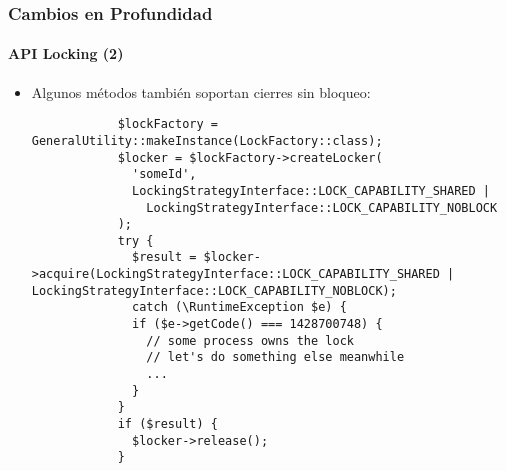 \begin{frame}[fragile]
	\frametitle{Cambios en Profundidad}
	\framesubtitle{API Locking (2)}

	\lstset{basicstyle=\tiny\ttfamily}

	\begin{itemize}

		\item Algunos métodos también soportan cierres sin bloqueo:

		\begin{lstlisting}
			$lockFactory = GeneralUtility::makeInstance(LockFactory::class);
			$locker = $lockFactory->createLocker(
			  'someId',
			  LockingStrategyInterface::LOCK_CAPABILITY_SHARED |
			    LockingStrategyInterface::LOCK_CAPABILITY_NOBLOCK
			);
			try {
			  $result = $locker->acquire(LockingStrategyInterface::LOCK_CAPABILITY_SHARED | LockingStrategyInterface::LOCK_CAPABILITY_NOBLOCK);
			  catch (\RuntimeException $e) {
			  if ($e->getCode() === 1428700748) {
			    // some process owns the lock
			    // let's do something else meanwhile
			    ...
			  }
			}
			if ($result) {
			  $locker->release();
			}
		\end{lstlisting}

	\end{itemize}

\end{frame}

